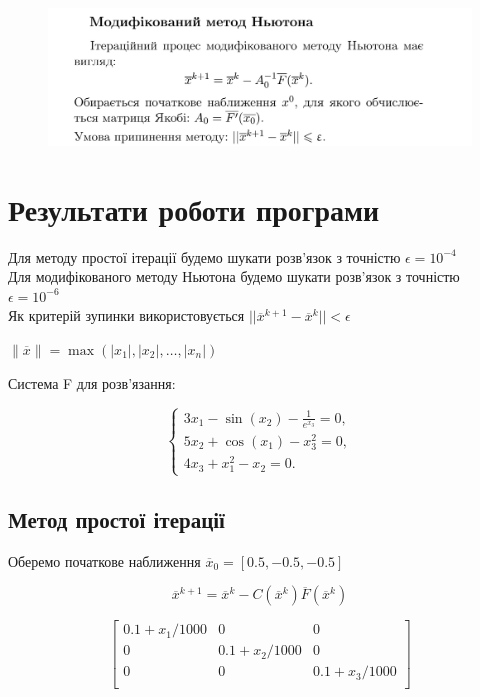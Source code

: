 \documentclass[a4paper, 12pt]{article}
\begin{document}
\begin{figure}[ht]
	\centering
	\includegraphics[width=0.9\linewidth]{mod_nuton1.png}
\end{figure}

\newpage

\section{Результати роботи програми}

Для методу простої ітерації будемо шукати розв'язок з точністю $\epsilon = 10^{-4}$ \\
Для модифікованого методу Ньютона будемо шукати розв'язок з точністю $\epsilon = 10^{-6}$ \\

Як критерій зупинки використовується $||\overline x^{k+1} - \overline x^k || < \epsilon $ 
\begin{center}
    \( \|\overline{x}\| = \max(|x_1|, |x_2|, \dots, |x_n|) \)
\end{center}

Система F для розв'язання: 

\begin{equation}
	\begin{cases}
	3x_1 - \sin(x_2) - \frac{1}{e^{x_3}} = 0, \\
	5x_2 + \cos(x_1) - x_3^2 = 0, \\
	4x_3 + x_1^2 - x_2 = 0.
	\end{cases}
	\label{eq:F}
\end{equation}


\subsection{Метод простої ітерації}

Оберемо початкове наближення \(\overline x_0 = [0.5, -0.5, -0.5]\)

\[ \overline x^{k+1} = \overline{x}^k - C(\overline x^k) \overline F(\overline x^k) \]

\begin{equation}
	\begin{bmatrix}
		0.1 + x_1/1000 & 0 & 0  \\ 
		0 & 0.1 + x_2/1000 & 0  \\ 
		0 & 0 & 0.1 + x_3/1000  \\ 
	\end{bmatrix}
\end{equation}
\end{document}

